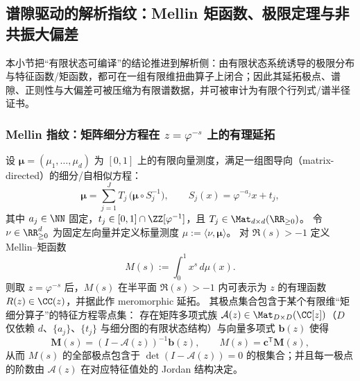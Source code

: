 \subsection{谱隙驱动的解析指纹：Mellin 矩函数、极限定理与非共振大偏差}\label{subsec:operator-mellin-spectral-fingerprint}

本小节把“有限状态可编译”的结论推进到解析侧：由有限状态系统诱导的极限分布与特征函数/矩函数，都可在一组有限维扭曲算子上闭合；因此其延拓极点、谱隙、正则性与大偏差可被压缩为有限谱数据，并可被审计为有限个行列式/谱半径证书。

\subsubsection{Mellin 指纹：矩阵细分方程在 \texorpdfstring{$z=\varphi^{-s}$}{z=phi^{-s}} 上的有理延拓}

\begin{theorem}\label{thm:conclusion62-mellin-rational}
设 \(\boldsymbol{\mu}=(\mu_1,\dots,\mu_d)\) 为 \([0,1]\) 上的有限向量测度，满足一组图导向（matrix-directed）的细分/自相似方程：
\begin{equation}\label{eq:operator-mellin-matrix-refinement}
\boldsymbol{\mu}
=\sum_{j=1}^{J}T_j\,\bigl(\boldsymbol{\mu}\circ S_j^{-1}\bigr),
\qquad
S_j(x)=\varphi^{-a_j}x+t_j,
\end{equation}
其中 \(a_j\in\NN\) 固定，\(t_j\in[0,1]\cap\ZZ[\varphi^{-1}]\)，且 \(T_j\in\Mat_{d\times d}(\RR_{\ge 0})\)。
令 \(\nu\in\RR_{\ge 0}^d\) 为固定左向量并定义标量测度 \(\mu:=\langle \nu,\boldsymbol{\mu}\rangle\)。
对 \(\Re(s)>-1\) 定义 Mellin--矩函数
\[
M(s):=\int_{0}^{1}x^{s}\,d\mu(x).
\]
则取 \(z=\varphi^{-s}\) 后，\(M(s)\) 在半平面 \(\Re(s)>-1\) 内可表示为 \(z\) 的有理函数 \(R(z)\in\CC(z)\)，并据此作 meromorphic 延拓。
其极点集合包含于某个有限维“矩细分算子”的特征方程零点集：
存在矩阵多项式族 \(\mathcal{A}(z)\in\Mat_{D\times D}(\CC[z])\)（\(D\) 仅依赖 \(d\)、\(\{a_j\}\)、\(\{t_j\}\) 与细分图的有限状态结构）与向量多项式 \(\mathbf{b}(z)\) 使得
\begin{equation}\label{eq:operator-mellin-linear-system}
\mathbf{M}(s)=(I-\mathcal{A}(z))^{-1}\mathbf{b}(z),
\qquad
M(s)=\mathbf{c}^{\mathsf T}\mathbf{M}(s),
\end{equation}
从而 \(M(s)\) 的全部极点包含于 \(\det(I-\mathcal{A}(z))=0\) 的根集合；并且每一极点的阶数由 \(\mathcal{A}(z)\) 在对应特征值处的 Jordan 结构决定。
\end{theorem}

